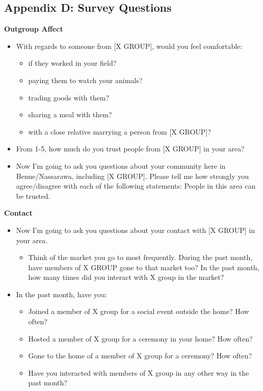 \documentclass[
]{article}
\providecommand{\tightlist}{%
  \setlength{\itemsep}{0pt}\setlength{\parskip}{0pt}}
\begin{document}
\hypertarget{appendix-d-survey-questions}{%
\subsection{Appendix D: Survey
Questions}\label{appendix-d-survey-questions}}

\textbf{Outgroup Affect}

\begin{itemize}
\tightlist
\item
  With regards to someone from {[}X GROUP{]}, would you feel
  comfortable:

  \begin{itemize}
  \tightlist
  \item
    if they worked in your field?
  \item
    paying them to watch your animals?
  \item
    trading goods with them?
  \item
    sharing a meal with them?
  \item
    with a close relative marrying a person from {[}X GROUP{]}?
  \end{itemize}
\item
  From 1-5, how much do you trust people from {[}X GROUP{]} in your
  area?
\item
  Now I'm going to ask you questions about your community here in
  Benue/Nassarawa, including {[}X GROUP{]}. Please tell me how strongly
  you agree/disagree with each of the following statements: People in
  this area can be trusted.
\end{itemize}

\textbf{Contact}

\begin{itemize}
\tightlist
\item
  Now I'm going to ask you questions about your contact with {[}X
  GROUP{]} in your area.

  \begin{itemize}
  \tightlist
  \item
    Think of the market you go to most frequently. During the past
    month, have members of X GROUP gone to that market too? In the past
    month, how many times did you interact with X group in the market?
  \end{itemize}
\item
  In the past month, have you:

  \begin{itemize}
  \tightlist
  \item
    Joined a member of X group for a social event outside the home? How
    often?
  \item
    Hosted a member of X group for a ceremony in your home? How often?
  \item
    Gone to the home of a member of X group for a ceremony? How often?
  \item
    Have you interacted with members of X group in any other way in the
    past month?
  \end{itemize}
\end{itemize}
\end{document}
